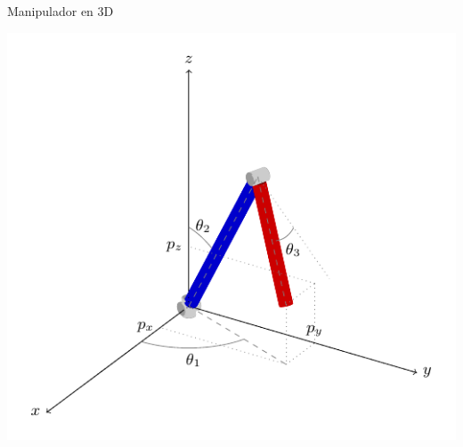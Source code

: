 \documentclass[presentation,aspectratio=169]{beamer}
\begin{document}
\begin{frame}[label={sec:org8e41adb}]{Manipulador en 3D}
\begin{center}
 \includegraphics[height=0.8\textheight]{../figures/3d-3dof-revolute}
\end{center}
\end{frame}
\end{document}
